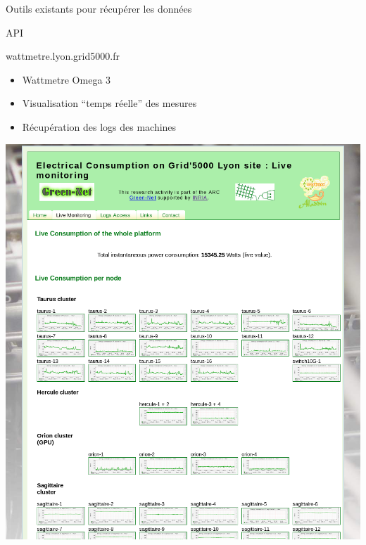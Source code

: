 \documentclass{beamer}
\begin{document}
\begin{frame}{Outils existants pour récupérer les données}

\begin{block}{API}

\end{block}

\begin{exampleblock}{wattmetre.lyon.grid5000.fr}
\begin{minipage}{0.77\linewidth}
\begin{itemize}
  \item Wattmetre Omega 3
  \item Visualisation ``temps réelle'' des mesures
  \item Récupération des logs des machines
\end{itemize}
\end{minipage}
\hfill
\begin{minipage}{0.17\linewidth}
\includegraphics[width=\linewidth]{live_monitoring.png}
\end{minipage}
\end{exampleblock}

\end{frame}
\end{document}
